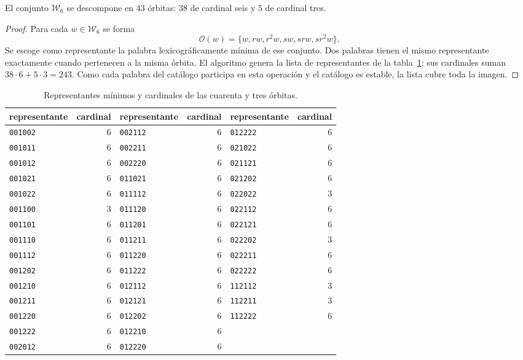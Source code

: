 \begin{proposition}
\label{act21:tpk:43}
El conjunto \(\mathcal W_6\) se descompone en \(43\) órbitas: \(38\)
de cardinal seis y \(5\) de cardinal tres.
\end{proposition}
\begin{proof}
Para cada \(w\in\mathcal W_6\) se forma
\[
 \mathcal O(w)=\{w,rw,r^2w,sw,srw,sr^2w\}.
\]
Se escoge como representante la palabra lexicográficamente mínima de ese
conjunto. Dos palabras tienen el mismo representante exactamente cuando
pertenecen a la misma órbita. El algoritmo genera la lista de representantes
de la tabla~\ref{act21:tpk:representantes}; sus cardinales suman
\(38\cdot6+5\cdot3=243\). Como cada palabra del catálogo participa en
esta operación y el catálogo es estable, la lista cubre toda la imagen.
\end{proof}

\begin{table}[!htbp]
\caption{Representantes mínimos y cardinales de las cuarenta y tres órbitas.}
\label{act21:tpk:representantes}
\small
\begin{tabular}{@{}lr@{\qquad}lr@{\qquad}lr@{}}
\toprule
representante&cardinal&representante&cardinal&representante&cardinal\\
\midrule
\texttt{001002}&6&\texttt{002112}&6&\texttt{012222}&6\\
\texttt{001011}&6&\texttt{002211}&6&\texttt{021022}&6\\
\texttt{001012}&6&\texttt{002220}&6&\texttt{021121}&6\\
\texttt{001021}&6&\texttt{011021}&6&\texttt{021202}&6\\
\texttt{001022}&6&\texttt{011112}&6&\texttt{022022}&3\\
\texttt{001100}&3&\texttt{011120}&6&\texttt{022112}&6\\
\texttt{001101}&6&\texttt{011201}&6&\texttt{022121}&6\\
\texttt{001110}&6&\texttt{011211}&6&\texttt{022202}&3\\
\texttt{001112}&6&\texttt{011220}&6&\texttt{022211}&6\\
\texttt{001202}&6&\texttt{011222}&6&\texttt{022222}&6\\
\texttt{001210}&6&\texttt{012112}&6&\texttt{112112}&3\\
\texttt{001211}&6&\texttt{012121}&6&\texttt{112211}&3\\
\texttt{001220}&6&\texttt{012202}&6&\texttt{112222}&6\\
\texttt{001222}&6&\texttt{012210}&6&&\\
\texttt{002012}&6&\texttt{012220}&6&&\\
\bottomrule
\end{tabular}
\end{table}

